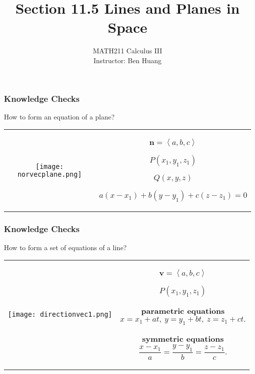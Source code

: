 \documentclass[10pt]{beamer}
\author[B.H.]{{\Large MATH211 Calculus III}\\\vspace{6pt}Instructor: Ben Huang}
\date{}
\title[Section 11.5]{Section 11.5 Lines and Planes in Space}
\institute[MU]{\texttt{[image: MCLogo-Bck.png]}}
\newcommand{\vv}{\mathbf v}
\newcommand{\inpr}[1]{\left\langle#1\right\rangle}
\begin{document}
\frame{\titlepage}

\begin{frame}
\frametitle{Knowledge Checks}
How to form an equation of a plane?\pause

\begin{tabular}{cc}
\texttt{[image: norvecplane.png]}&\parbox{.5\textwidth}{
$\mathbf n = \inpr{a,b,c}$

$P(x_1,y_1,z_1)$

$Q(x,y,z)$ 

\[a(x-x_1)+b(y-y_1)+c(z-z_1) = 0 \]

\vspace{15em}
}
\end{tabular}
\end{frame}
\begin{frame}
\frametitle{Knowledge Checks}
How to form a set of equations of a line?\pause

\begin{tabular}{cc}
\texttt{[image: directionvec1.png]}&\parbox{.5\textwidth}{
$\vv=\inpr{a,b,c}$

$P(x_1,y_1,z_1)$

\vspace{1em}
{\bf parametric equations}
\[
x=x_1+at,\ y = y_1+bt,\ z = z_1+ct.
\]

{\bf symmetric equations}
\[
\frac{x-x_1}{a} = \frac{y-y_1}{b} = \frac{z-z_1}{c}.
\]

\vspace{10em}
}


\end{tabular}
\end{frame}
\end{document}
